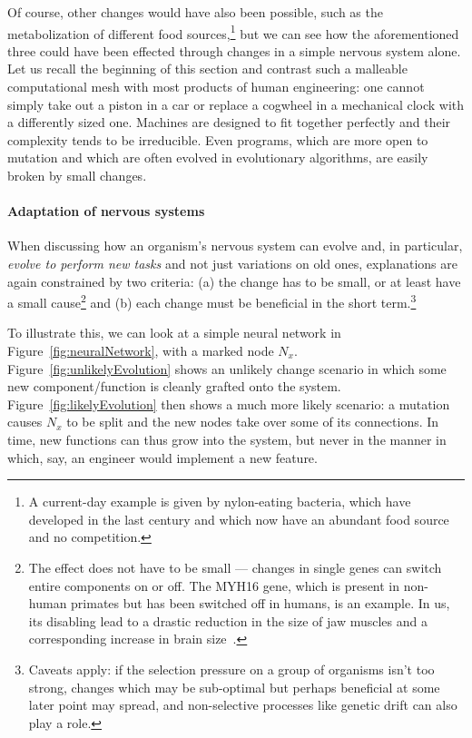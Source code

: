 Of course, other changes would have also been possible, such as the metabolization of different food sources,\footnote{A current-day example is given by nylon-eating bacteria, which have developed in the last century and which now have an abundant food source and no competition.} but we can see how the aforementioned three could have been effected through changes in a simple nervous system alone. Let us recall the beginning of this section and contrast such a malleable computational mesh with most products of human engineering: one cannot simply take out a piston in a car or replace a cogwheel in a mechanical clock with a differently sized one. Machines are designed to fit together perfectly and their complexity tends to be irreducible. Even programs, which are more open to mutation and which are often evolved in evolutionary algorithms, are easily broken by small changes.

\paragraph{Adaptation of nervous systems}  When discussing how an organism's nervous system can evolve and, in particular, {\em evolve to perform new tasks} and not just variations on old ones, explanations are again constrained by two criteria: (a) the change has to be small, or at least have a small cause\footnote{The effect does not have to be small --- changes in single genes can switch entire components on or off. The MYH16 gene, which is present in non-human primates but has been switched off in humans, is an example. In us, its disabling lead to a drastic reduction in the size of jaw muscles and a corresponding increase in brain size~\cite{carroll2005}.} and (b) each change must be beneficial in the short term.\footnote{Caveats apply: if the selection pressure on a group of organisms isn't too strong, changes which may be sub-optimal but perhaps beneficial at some later point may spread, and non-selective processes like genetic drift can also play a role.}

To illustrate this, we can look at a simple neural network in Figure~\ref{fig:neuralNetwork}, with a marked node $N_x$. Figure~\ref{fig:unlikelyEvolution} shows an unlikely change scenario in which some new component/function is cleanly grafted onto the system. Figure~\ref{fig:likelyEvolution} then shows a much more likely scenario: a mutation causes $N_x$ to be split and the new nodes take over some of its connections. In time, new functions can thus grow into the system, but never in the manner in which, say, an engineer would implement a new feature.

